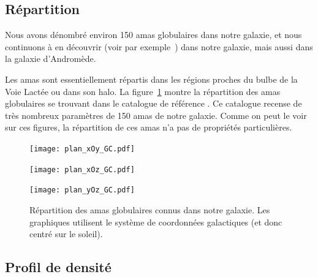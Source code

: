 		\subsection{Répartition}

			Nous avons dénombré environ 150 amas globulaires dans
			notre galaxie, et nous continuons à en découvrir (voir par
			exemple~\cite{2014ApJ...786L...3L}) dans notre galaxie, mais aussi dans la galaxie d'Andromède.

			Les amas sont essentiellement répartis dans les régions proches du bulbe de la Voie Lactée ou dans son halo. La
			figure~\ref{Fig::Intro::repartition} montre la répartition des amas globulaires se trouvant dans le catalogue de référence
			\cite{Harris}. Ce catalogue recense de très nombreux paramètres de 150 amas de notre galaxie. Comme on peut le voir sur ces
			figures, la répartition de ces amas n'a pas de propriétés particulières.


			\begin{figure}[h]
				\centering
					\begin{center}
				\begin{minipage}{0.33\linewidth}
						\texttt{[image: plan\_xOy\_GC.pdf]}
				\end{minipage}\hfill
				\begin{minipage}{0.33\linewidth}
						\texttt{[image: plan\_xOz\_GC.pdf]}
				\end{minipage}\hfill
				\begin{minipage}{0.33\linewidth}
						\texttt{[image: plan\_yOz\_GC.pdf]}
				\end{minipage}
					\end{center}
				\caption{\label{Fig::Intro::repartition}Répartition des amas globulaires connus dans
				notre galaxie. Les graphiques utilisent le système de coordonnées galactiques (et donc centré sur le soleil).}
			\end{figure}


		\subsection{Profil de densité}

